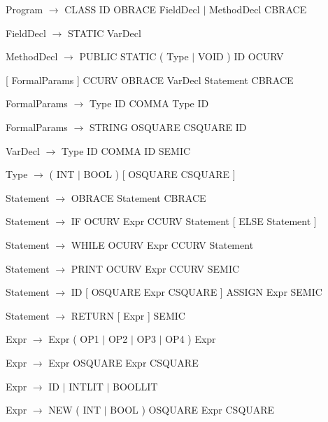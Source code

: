 \documentclass[11pt,a4paper]{article}
\begin{document}
\hspace{-1cm}Program $\rightarrow$ CLASS ID OBRACE { FieldDecl $\mid$ MethodDecl } CBRACE

\hspace{-1cm}FieldDecl $\rightarrow$ STATIC VarDecl

\hspace{-1cm}MethodDecl $\rightarrow$ PUBLIC STATIC ( Type $\mid$ VOID ) ID OCURV

[ FormalParams ] CCURV OBRACE { VarDecl } { Statement } CBRACE

\hspace{-1cm}FormalParams $\rightarrow$ Type ID { COMMA Type ID }

\hspace{-1cm}FormalParams $\rightarrow$ STRING OSQUARE CSQUARE ID

\hspace{-1cm}VarDecl $\rightarrow$ Type ID { COMMA ID } SEMIC

\hspace{-1cm}Type $\rightarrow$ ( INT $\mid$ BOOL ) [ OSQUARE CSQUARE ]

\hspace{-1cm}Statement $\rightarrow$ OBRACE { Statement } CBRACE

\hspace{-1cm}Statement $\rightarrow$ IF OCURV Expr CCURV Statement [ ELSE Statement ]

\hspace{-1cm}Statement $\rightarrow$ WHILE OCURV Expr CCURV Statement

\hspace{-1cm}Statement $\rightarrow$ PRINT OCURV Expr CCURV SEMIC

\hspace{-1cm}Statement $\rightarrow$ ID [ OSQUARE Expr CSQUARE ] ASSIGN Expr SEMIC

\hspace{-1cm}Statement $\rightarrow$ RETURN [ Expr ] SEMIC

\hspace{-1cm}Expr $\rightarrow$ Expr ( OP1 $\mid$ OP2 $\mid$ OP3 $\mid$ OP4 ) Expr

\hspace{-1cm}Expr $\rightarrow$ Expr OSQUARE Expr CSQUARE

\hspace{-1cm}Expr $\rightarrow$ ID $\mid$ INTLIT $\mid$ BOOLLIT

\hspace{-1cm}Expr $\rightarrow$ NEW ( INT $\mid$ BOOL ) OSQUARE Expr CSQUARE
\end{document}
